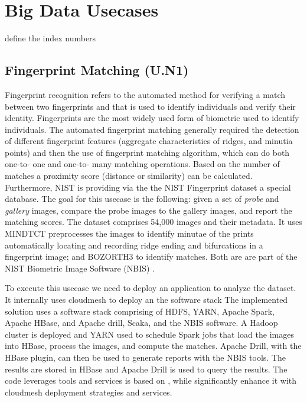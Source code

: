 \section{Big Data Usecases}


define the index numbers

\subsection{Fingerprint Matching (U.N1)}

Fingerprint recognition refers to the automated method for verifying a
match between two fingerprints and that is used to identify
individuals and verify their identity. Fingerprints are the most
widely used form of biometric used to identify individuals. The
automated fingerprint matching generally required the detection of
different fingerprint features (aggregate characteristics of ridges,
and minutia points) and then the use of fingerprint matching
algorithm, which can do both one-to- one and one-to- many matching
operations. Based on the number of matches a proximity score (distance
or similarity) can be calculated. Furthermore, NIST is providing via
the the NIST Fingerprint dataset a special database. The goal for this
usecase is the following: given a set of {\it probe} and {\em gallery}
images, compare the probe images to the gallery images, and report the
matching scores.  The dataset comprises 54,000 images and their
metadata.  It uses MINDTCT \cite{Hyungro:??} preprocesses the images
to identify minutae of the prints automatically locating and recording
ridge ending and bifurcations in a fingerprint image; and BOZORTH3
\cite{Hyungro:??} to identify matches. Both are are part of the NIST
Biometric Image Software (NBIS) \cite{Hyungro:??}.

To execute this usecase we need to deploy an application to analyze
the dataset. It internally uses cloudmesh to deploy an the software
stack The implemented \cite{??} 
solution uses a software stack comprising of HDFS, YARN, Apache Spark,
Apache HBase, and Apache drill, Scaka, and the NBIS software. A Hadoop
cluster is deployed and YARN used to schedule Spark jobs that load the
images into HBase, process the images, and compute the matches. Apache
Drill, with the HBase plugin, can then be used to generate reports
with the NBIS tools\cite{??}. The results are stored in HBase and
Apache Drill \cite{??} is used to query the results.  The code
leverages tools and services is based on \cite{??}   , while significantly
enhance it with cloudmesh deployment strategies and services.

